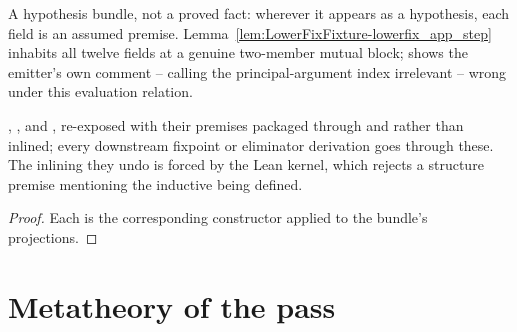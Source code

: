 \begin{remark}
 A hypothesis bundle, not a proved fact: wherever it appears as a hypothesis, each field
is an assumed premise.
 Lemma~\ref{lem:LowerFixFixture-lowerfix_app_step} inhabits all twelve fields at a
genuine two-member mutual block;  shows the emitter's own comment -- calling the
principal-argument index irrelevant -- wrong under this evaluation relation.
\end{remark}

\begin{lemma}
\label{lem:Lower-fixConst-prime}
\leanok
{}
 , ,  and , re-exposed with
their premises packaged through \hl{} and  rather than inlined;
every downstream fixpoint or eliminator derivation goes through these.
 The inlining they undo
is forced by the Lean kernel, which rejects a structure premise mentioning the inductive being defined.
\end{lemma}
\begin{proof}
\leanok
{}
 Each is the corresponding constructor applied to the bundle's projections.
\end{proof}

\section{Metatheory of the pass}
\label{sec:lowering:meta}


